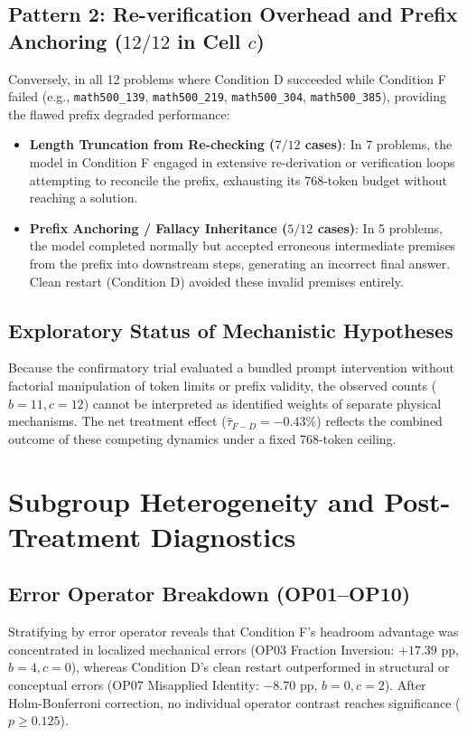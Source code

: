 \documentclass[11pt]{article}
\begin{document}
\subsection{Pattern 2: Re-verification Overhead and Prefix Anchoring ($12/12$ in Cell $c$)}
Conversely, in all 12 problems where Condition D succeeded while Condition F failed (e.g., \texttt{math500\_139}, \texttt{math500\_219}, \texttt{math500\_304}, \texttt{math500\_385}), providing the flawed prefix degraded performance:
\begin{itemize}
    \item \textbf{Length Truncation from Re-checking ($7/12$ cases)}: In 7 problems, the model in Condition F engaged in extensive re-derivation or verification loops attempting to reconcile the prefix, exhausting its 768-token budget without reaching a solution.
    \item \textbf{Prefix Anchoring / Fallacy Inheritance ($5/12$ cases)}: In 5 problems, the model completed normally but accepted erroneous intermediate premises from the prefix into downstream steps, generating an incorrect final answer. Clean restart (Condition D) avoided these invalid premises entirely.
\end{itemize}

\subsection{Exploratory Status of Mechanistic Hypotheses}
Because the confirmatory trial evaluated a bundled prompt intervention without factorial manipulation of token limits or prefix validity, the observed counts ($b=11, c=12$) cannot be interpreted as identified weights of separate physical mechanisms. The net treatment effect ($\hat{\tau}_{F-D} = -0.43\%$) reflects the combined outcome of these competing dynamics under a fixed 768-token ceiling.

\section{Subgroup Heterogeneity and Post-Treatment Diagnostics}
\label{sec:subgroups}

\subsection{Error Operator Breakdown (OP01--OP10)}
Stratifying by error operator reveals that Condition F's headroom advantage was concentrated in localized mechanical errors (OP03 Fraction Inversion: $+17.39\text{ pp}$, $b=4, c=0$), whereas Condition D's clean restart outperformed in structural or conceptual errors (OP07 Misapplied Identity: $-8.70\text{ pp}$, $b=0, c=2$). After Holm-Bonferroni correction, no individual operator contrast reaches significance ($p \ge 0.125$).
\end{document}
